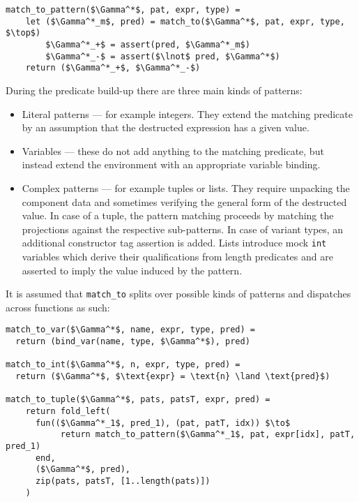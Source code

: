 \begin{lstlisting}[language=pseudocode]
match_to_pattern($\Gamma^*$, pat, expr, type) =
    let ($\Gamma^*_m$, pred) = match_to($\Gamma^*$, pat, expr, type, $\top$)
        $\Gamma^*_+$ = assert(pred, $\Gamma^*_m$)
        $\Gamma^*_-$ = assert($\lnot$ pred, $\Gamma^*$)
    return ($\Gamma^*_+$, $\Gamma^*_-$)
\end{lstlisting}

During the predicate build-up there are three main kinds of patterns:
\begin{itemize}
\item Literal patterns --- for example integers. They extend the matching
  predicate by an assumption that the destructed expression has a given
  value.
\item Variables --- these do not add anything to the matching predicate, but
  instead extend the environment with an appropriate variable binding.
\item Complex patterns --- for example tuples or lists. They require unpacking
  the component data and sometimes verifying the general form of the destructed
  value. In case of a tuple, the pattern matching proceeds by matching the
  projections against the respective sub-patterns. In case of variant types, an
  additional constructor tag assertion is added. Lists introduce mock
  \texttt{int} variables which derive their qualifications from length
  predicates and are asserted to imply the value induced by the pattern.
\end{itemize}

It is assumed that \texttt{match\_to} splits over possible kinds of patterns and
dispatches across functions as such:

\begin{minipage}{\linewidth}
\begin{lstlisting}[language=pseudocode]
match_to_var($\Gamma^*$, name, expr, type, pred) =
  return (bind_var(name, type, $\Gamma^*$), pred)

match_to_int($\Gamma^*$, n, expr, type, pred) =
  return ($\Gamma^*$, $\text{expr} = \text{n} \land \text{pred}$)

match_to_tuple($\Gamma^*$, pats, patsT, expr, pred) =
    return fold_left(
      fun(($\Gamma^*_1$, pred_1), (pat, patT, idx)) $\to$
           return match_to_pattern($\Gamma^*_1$, pat, expr[idx], patT, pred_1)
      end,
      ($\Gamma^*$, pred),
      zip(pats, patsT, [1..length(pats)])
    )
\end{lstlisting}
\end{minipage}

